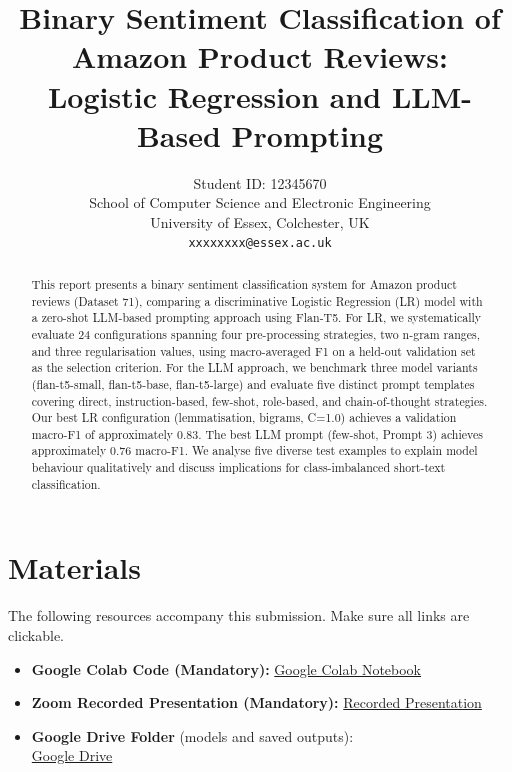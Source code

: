\documentclass[10pt,twocolumn]{article}
\title{Binary Sentiment Classification of Amazon Product Reviews:\\
       Logistic Regression and LLM-Based Prompting}
\author{
  Student ID: 12345670 \\
  School of Computer Science and Electronic Engineering \\
  University of Essex, Colchester, UK \\
  \texttt{xxxxxxxx@essex.ac.uk}
}
\begin{document}
\maketitle

\begin{abstract}
This report presents a binary sentiment classification system for Amazon
product reviews (Dataset 71), comparing a discriminative Logistic Regression
(LR) model with a zero-shot LLM-based prompting approach using Flan-T5.
For LR, we systematically evaluate 24 configurations spanning four
pre-processing strategies, two n-gram ranges, and three regularisation values,
using macro-averaged F1 on a held-out validation set as the selection criterion.
For the LLM approach, we benchmark three model variants
(flan-t5-small, flan-t5-base, flan-t5-large) and evaluate five distinct prompt
templates covering direct, instruction-based, few-shot, role-based, and
chain-of-thought strategies.
Our best LR configuration (lemmatisation, bigrams, C=1.0) achieves a validation
macro-F1 of approximately 0.83.
The best LLM prompt (few-shot, Prompt 3) achieves approximately 0.76 macro-F1.
We analyse five diverse test examples to explain model behaviour qualitatively
and discuss implications for class-imbalanced short-text classification.
\end{abstract}

\section*{Materials}
\label{sec:materials}

The following resources accompany this submission.
Make sure all links are clickable.

\begin{itemize}
  \item \textbf{Google Colab Code (Mandatory):}
        \href{https://REPLACE\_WITH\_COLAB\_LINK}{Google Colab Notebook}
  \item \textbf{Zoom Recorded Presentation (Mandatory):}
        \href{https://REPLACE\_WITH\_ZOOM\_LINK}{Recorded Presentation}
  \item \textbf{Google Drive Folder} (models and saved outputs):\\
        \href{https://REPLACE\_WITH\_DRIVE\_LINK}{Google Drive}
\end{itemize}
\end{document}
